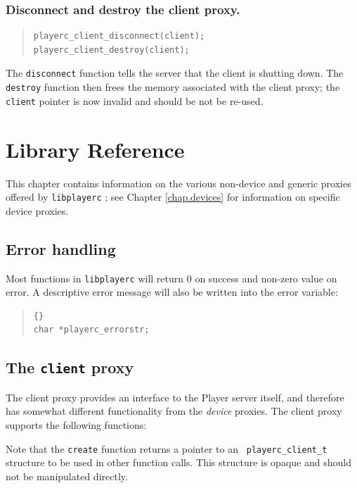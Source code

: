 \documentclass[11pt]{report}
\def\libplayerc {{\tt libplayerc} }
\begin{document}
\subsection*{Disconnect and destroy the client proxy.}

\begin{quote}\begin{verbatim}
playerc_client_disconnect(client);
playerc_client_destroy(client);
\end{verbatim}\end{quote}
The {\tt disconnect} function tells the server that the client is
shutting down.  The {\tt destroy} function then frees the memory
associated with the client proxy; the {\tt client} pointer is now
invalid and should be not be re-used.



\chapter{Library Reference}

This chapter contains information on the various non-device and
generic proxies offered by \libplayerc; see Chapter \ref{chap.devices}
for information on specific device proxies.


\section{Error handling}

Most functions in \libplayerc will return 0 on success and non-zero
value on error.  A descriptive error message will also be written into
the error variable:
\begin{quote}
\begin{lstlisting}{}
char *playerc_errorstr;
\end{lstlisting}
\end{quote}


\section{The {\tt client} proxy}

The client proxy provides an interface to the Player server itself,
and therefore has somewhat different functionality from the {\em
device} proxies.  The client proxy supports the following functions:
\begin{quote}

\end{quote}
Note that the {\tt create} function returns a pointer to an {\tt
playerc\_client\_t} structure to be used in other function calls.
This structure is opaque and should not be manipulated directly.
\end{document}
